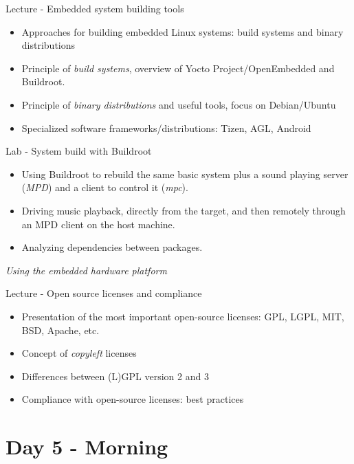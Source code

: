 \documentclass[a4paper,12pt,obeyspaces,spaces,hyphens]{article}
\begin{document}
\feagendatwocolumn
{Lecture - Embedded system building tools}
{
  \begin{itemize}
  \item Approaches for building embedded Linux systems: build systems
    and binary distributions
  \item Principle of {\em build systems}, overview of Yocto
    Project/OpenEmbedded and Buildroot.
  \item Principle of {\em binary distributions} and useful tools,
    focus on Debian/Ubuntu
  \item Specialized software frameworks/distributions: Tizen, AGL,
    Android
  \end{itemize}
}
{Lab - System build with Buildroot}
{
  \begin{itemize}
  \item Using Buildroot to rebuild the same basic system
        plus a sound playing server ({\em MPD}) and a
        client to control it ({\em mpc}).
  \item Driving music playback, directly from the target,
        and then remotely through an MPD client on the
	host machine.
  \item Analyzing dependencies between packages.
  \end{itemize}

  \vspace{0.5cm}
  {\em Using the embedded hardware platform}
}

\feagendaonecolumn
{Lecture - Open source licenses and compliance}
{
  \begin{itemize}
  \item Presentation of the most important open-source licenses: GPL,
    LGPL, MIT, BSD, Apache, etc.
  \item Concept of {\em copyleft} licenses
  \item Differences between (L)GPL version 2 and 3
  \item Compliance with open-source licenses: best practices
  \end{itemize}
}

\section{Day 5 - Morning}
\end{document}

